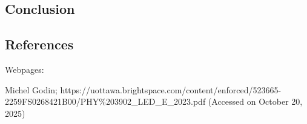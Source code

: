 \documentclass[11pt]{article}
\makeatletter
\newcommand{\boxspacing}{\kern\kvtcb@left@rule\kern\kvtcb@boxsep}
\newcommand{\prompt}[4]{
        {\ttfamily\llap{{\color{#2}[#3]:\hspace{3pt}#4}}\vspace{-\baselineskip}}
    }
\makeatother
\begin{document}
    

    \hypertarget{conclusion}{%
\subsection{Conclusion}\label{conclusion}}

    

    \hypertarget{references}{%
\subsection{References}\label{references}}

    Webpages:

Michel Godin;
https://uottawa.brightspace.com/content/enforced/523665-2259FS0268421B00/PHY\%203902\_LED\_E\_2023.pdf
(Accessed on October 20, 2025)

    \begin{tcolorbox}[breakable, size=fbox, boxrule=1pt, pad at break*=1mm,colback=cellbackground, colframe=cellborder]
\prompt{In}{incolor}{ }{\boxspacing}
\begin{Verbatim}[commandchars=\\\{\}]

\end{Verbatim}
\end{tcolorbox}


    
    
    
\end{document}
